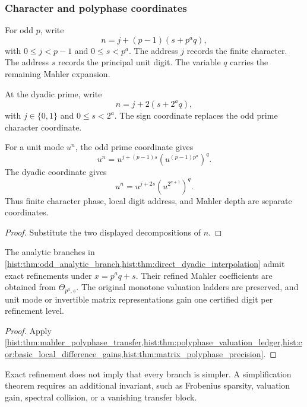 \subsubsection{Character and polyphase coordinates}

For odd \(p\), write
\[
\boxed{
n=j+(p-1)(s+p^aq),
}
\]
with \(0\leq j<p-1\) and \(0\leq s<p^a\). The address \(j\) records the finite character. The address \(s\) records the principal unit digit. The variable \(q\) carries the remaining Mahler expansion.

At the dyadic prime, write
\[
\boxed{
n=j+2(s+2^aq),
}
\]
with \(j\in\{0,1\}\) and \(0\leq s<2^a\). The sign coordinate replaces the odd prime character coordinate.

\begin{histproposition}\label{hist:prop:local_phase_lattice}
For a unit mode \(u^n\), the odd prime coordinate gives
\[
\boxed{
u^n
=
u^{j+(p-1)s}
\left(u^{(p-1)p^a}\right)^q.
}
\]
The dyadic coordinate gives
\[
\boxed{
u^n
=
u^{j+2s}
\left(u^{2^{a+1}}\right)^q.
}
\]
Thus finite character phase, local digit address, and Mahler depth are separate coordinates.
\end{histproposition}

\begin{proof}
Substitute the two displayed decompositions of \(n\).
\end{proof}

\begin{histcorollary}\label{hist:cor:euler_polyphase_refinement}
The analytic branches in \cref{hist:thm:odd_analytic_branch,hist:thm:direct_dyadic_interpolation} admit exact refinements under \(x=p^aq+s\). Their refined Mahler coefficients are obtained from \(\Theta_{p^a,s}\). The original monotone valuation ladders are preserved, and unit mode or invertible matrix representations gain one certified digit per refinement level.
\end{histcorollary}

\begin{proof}
Apply \cref{hist:thm:mahler_polyphase_transfer,hist:thm:polyphase_valuation_ledger,hist:cor:basic_local_difference_gains,hist:thm:matrix_polyphase_precision}.
\end{proof}

\begin{histremark}\label{hist:rem:polyphase_boundary}
Exact refinement does not imply that every branch is simpler. A simplification theorem requires an additional invariant, such as Frobenius sparsity, valuation gain, spectral collision, or a vanishing transfer block.
\end{histremark}
